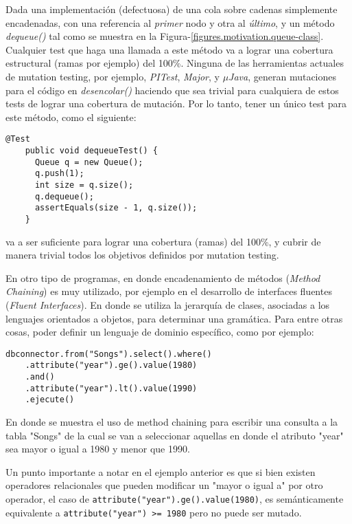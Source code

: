 Dada una implementaci\'on (defectuosa) de una cola sobre cadenas simplemente encadenadas, con una referencia al \emph{primer} nodo y otra al \emph{\'ultimo}, y un m\'etodo \emph{dequeue()} tal como se muestra en la Figura-\ref{figures.motivation.queue-class}. Cualquier test que haga una llamada a este m\'etodo va a lograr una cobertura estructural (ramas por ejemplo) del 100\%.
Ninguna de las herramientas actuales de mutation testing, por ejemplo, \emph{PITest}, \emph{Major}, y \emph{$\mu$Java}, generan mutaciones para el c\'odigo en \emph{desencolar()} haciendo que sea trivial para cualquiera de estos tests de lograr una cobertura de mutaci\'on. Por lo tanto, tener un \'unico test para este m\'etodo, como el siguiente:
\begin{center}
	\begin{lstlisting}[frame=tlrb, mathescape=true]
    @Test
    public void dequeueTest() {
      Queue q = new Queue();
      q.push(1);
      int size = q.size();
      q.dequeue();
      assertEquals(size - 1, q.size());
    }
	\end{lstlisting}
\end{center}
va a ser suficiente para lograr una cobertura (ramas) del 100\%, y cubrir de manera trivial todos los objetivos definidos por mutation testing.

En otro tipo de programas, en donde encadenamiento de m\'etodos (\emph{Method Chaining}) es muy utilizado, por ejemplo en el desarrollo de interfaces fluentes (\emph{Fluent Interfaces}). En donde se utiliza la jerarqu\'ia de clases, asociadas a los lenguajes orientados a objetos, para determinar una gram\'atica. Para entre otras cosas, poder definir un lenguaje de dominio espec\'ifico, como por ejemplo:
\begin{center}
	\begin{lstlisting}[mathescape=true]
	dbconnector.from("Songs").select().where()
	.attribute("year").ge().value(1980)
	.and()
	.attribute("year").lt().value(1990)
	.ejecute()
	\end{lstlisting}
\end{center}
En donde se muestra el uso de method chaining para escribir una consulta a la tabla "Songs" de la cual se van a seleccionar aquellas en donde el atributo "year" sea mayor o igual a 1980 y menor que 1990.

Un punto importante a notar en el ejemplo anterior es que si bien existen operadores relacionales que pueden modificar un "mayor o igual a" por otro operador, el caso de \texttt{attribute("year").ge().value(1980)}, es sem\'anticamente equivalente a \texttt{attribute("year") >= 1980} pero no puede ser mutado.

